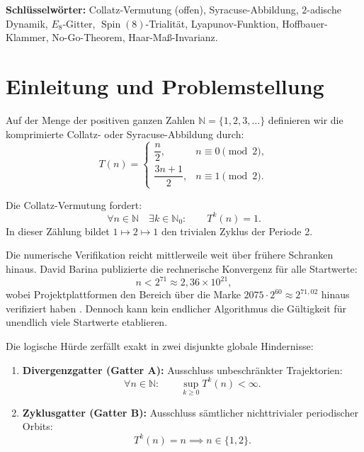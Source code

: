 \documentclass[11pt,reqno]{amsart}
\theoremstyle{definition}
\theoremstyle{remark}
\numberwithin{equation}{section}
\begin{document}
\noindent\textbf{Schlüsselwörter:}
Collatz-Vermutung (offen), Syracuse-Abbildung, $2$-adische Dynamik,
$E_8$-Gitter, $\operatorname{Spin}(8)$-Trialität, Lyapunov-Funktion,
Hoffbauer-Klammer, No-Go-Theorem, Haar-Maß-Invarianz.

\section{Einleitung und Problemstellung}

Auf der Menge der positiven ganzen Zahlen $\mathbb{N} = \{1, 2, 3, \ldots\}$ definieren wir die komprimierte Collatz- oder Syracuse-Abbildung durch:
\begin{equation}
T(n) =
\begin{cases}
\dfrac{n}{2}, & n \equiv 0 \pmod 2, \\[0.8em]
\dfrac{3n+1}{2}, & n \equiv 1 \pmod 2.
\end{cases}
\label{eq:syracuse}
\end{equation}

Die Collatz-Vermutung fordert:
\begin{equation}
\forall n \in \mathbb{N} \quad \exists k \in \mathbb{N}_0: \qquad T^k(n) = 1.
\end{equation}
In dieser Zählung bildet $1 \mapsto 2 \mapsto 1$ den trivialen Zyklus der Periode 2.

Die numerische Verifikation reicht mittlerweile weit über frühere Schranken hinaus. David Barina publizierte die rechnerische Konvergenz für alle Startwerte:
\begin{equation}
n < 2^{71} \approx 2{,}36 \times 10^{21},
\end{equation}
wobei Projektplattformen den Bereich über die Marke $2075 \cdot 2^{60} \approx 2^{71{,}02}$ hinaus verifiziert haben \cite{Barina2025}. Dennoch kann kein endlicher Algorithmus die Gültigkeit für unendlich viele Startwerte etablieren.

Die logische Hürde zerfällt exakt in zwei disjunkte globale Hindernisse:
\begin{enumerate}
\item \textbf{Divergenzgatter (Gatter A):} Ausschluss unbeschränkter Trajektorien:
\begin{equation}
\forall n \in \mathbb{N}: \qquad \sup_{k \ge 0} T^k(n) < \infty.
\label{eq:gateA}
\end{equation}
\item \textbf{Zyklusgatter (Gatter B):} Ausschluss sämtlicher nichttrivialer periodischer Orbits:
\begin{equation}
T^k(n) = n \implies n \in \{1, 2\}.
\label{eq:gateB}
\end{equation}
\end{enumerate}
\end{document}
